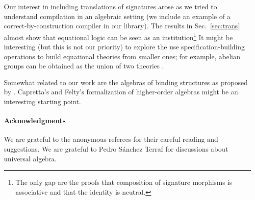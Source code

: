 Our interest in including translations of signatures arose as we tried
to understand compilation in an algebraic setting (we include an
example of a correct-by-construction compiler in our library). The
results in Sec.~\ref{sec:trans} almost show that equational logic can
be seen as an institution\footnote{The only gap are the proofs that
  composition of signature morphisms is associative and that the
  identity is neutral.} It might be interesting (but this is not our
priority) to explore the use specification-building operations to
build equational theories from smaller ones; for example, abelian
groups can be obtained as the union of two theories
\citep[see][p. 232]{sannella2012foundations}.

Somewhat related to our work are the algebras of binding structures as
proposed by \cite{fiore-2010}. Capretta's and Felty's
\citeyearpar{capretta/felty:2009} formalization of higher-order
algebras might be an interesting starting point.



\paragraph*{Acknowledgments}
  We are grateful to the anonymous referees for their careful reading
  and suggestions. We are grateful to Pedro Sánchez Terraf for discussions
  about universal algebra.

